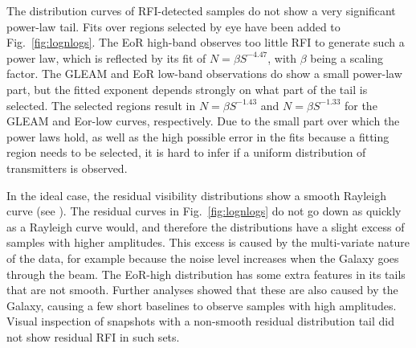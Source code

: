 \documentclass{pasa}
\begin{document}
The distribution curves of RFI-detected samples do not show a very significant power-law tail. Fits over regions selected by eye have been added to Fig.~\ref{fig:lognlogs}. The EoR high-band observes too little RFI to generate such a power law, which is reflected by its fit of $N=\beta S^{-4.47}$, with $\beta$ being a scaling factor. The GLEAM and EoR low-band observations do show a small power-law part, but the fitted exponent depends strongly on what part of the tail is selected. The selected regions result in $N=\beta S^{-1.43}$ and $N=\beta S^{-1.33}$ for the GLEAM and Eor-low curves, respectively. Due to the small part over which the power laws hold, as well as the high possible error in the fits because a fitting region needs to be selected, it is hard to infer if a uniform distribution of transmitters is observed.

In the ideal case, the residual visibility distributions show a smooth Rayleigh curve (see \citealt{offringa-rfi-distributions}). The residual curves in Fig.~\ref{fig:lognlogs} do not go down as quickly as a Rayleigh curve would, and therefore the distributions have a slight excess of samples with higher amplitudes. This excess is caused by the multi-variate nature of the data, for example because the noise level increases when the Galaxy goes through the beam. The EoR-high distribution has some extra features in its tails that are not smooth. Further analyses showed that these are also caused by the Galaxy, causing a few short baselines to observe samples with high amplitudes. Visual inspection of snapshots with a non-smooth residual distribution tail did not show residual RFI in such sets.
\end{document}
